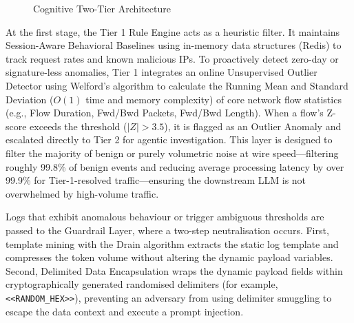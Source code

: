 \documentclass[12pt,a4paper]{article}
\begin{document}
\begin{figure}[!htbp]
{
    }
    \caption{Cognitive Two-Tier Architecture}
    \label{fig:architecture}
\end{figure}

At the first stage, the Tier 1 Rule Engine acts as a heuristic filter. It maintains Session-Aware Behavioral Baselines using in-memory data structures (Redis) to track request rates and known malicious IPs. To proactively detect zero-day or signature-less anomalies, Tier 1 integrates an online Unsupervised Outlier Detector using Welford's algorithm to calculate the Running Mean and Standard Deviation ($O(1)$ time and memory complexity) of core network flow statistics (e.g., Flow Duration, Fwd/Bwd Packets, Fwd/Bwd Length). When a flow's Z-score exceeds the threshold ($|Z| > 3.5$), it is flagged as an Outlier Anomaly and escalated directly to Tier 2 for agentic investigation. This layer is designed to filter the majority of benign or purely volumetric noise at wire speed---filtering roughly 99.8\% of benign events and reducing average processing latency by over 99.9\% for Tier-1-resolved traffic---ensuring the downstream LLM is not overwhelmed by high-volume traffic.

Logs that exhibit anomalous behaviour or trigger ambiguous thresholds are passed to the Guardrail Layer, where a two-step neutralisation occurs. First, template mining with the Drain algorithm extracts the static log template and compresses the token volume without altering the dynamic payload variables. Second, Delimited Data Encapsulation wraps the dynamic payload fields within cryptographically generated randomised delimiters (for example, \verb|<<RANDOM_HEX>>|), preventing an adversary from using delimiter smuggling to escape the data context and execute a prompt injection.
\end{document}
